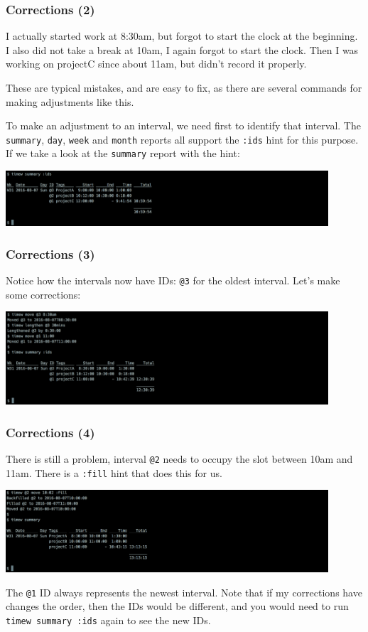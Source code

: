 \documentclass[t,handout]{beamer}
\begin{document}
\begin{frame}[fragile]\frametitle{Corrections (2)}
    \vfill
    I actually started work at 8:30am, but forgot to start the clock at the beginning. I also did not take a break at 10am, I again forgot to start the clock. Then I was working on projectC since about 11am, but didn't record it properly.

    These are typical mistakes, and are easy to fix, as there are several commands for making adjustments like this.

    To make an adjustment to an interval, we need first to identify that interval. The \verb=summary=, \verb=day=, \verb=week= and \verb=month= reports all support the \verb=:ids= hint for this purpose. If we take a look at the \verb=summary= report with the hint:

    \includegraphics[width=12cm]{images/tutorial38.png}
\end{frame}

\begin{frame}[fragile]\frametitle{Corrections (3)}
    \vfill
    Notice how the intervals now have IDs: \verb=@3= for the oldest interval. Let's make some corrections:

    \includegraphics[width=12cm]{images/tutorial39.png}
\end{frame}

\begin{frame}[fragile]\frametitle{Corrections (4)}
    \vfill
    There is still a problem, interval \verb=@2= needs to occupy the slot between 10am and 11am. There is a \verb=:fill= hint that does this for us.

    \includegraphics[width=12cm]{images/tutorial40.png}

    The \verb=@1= ID always represents the newest interval. Note that if my corrections have changes the order, then the IDs would be different, and you would need to run \verb=timew summary :ids= again to see the new IDs.
\end{frame}
\end{document}
